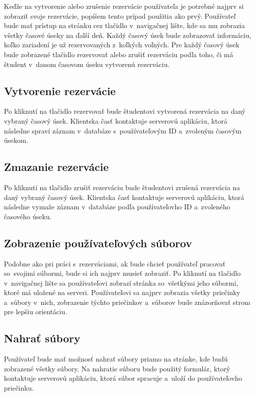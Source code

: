 Keďže na vytvorenie alebo zrušenie rezervácie používateľa je potrebné najprv si zobraziť svoje rezervácie, popíšem tento prípad použitia ako prvý. Používateľ bude mať prístup na stránku cez tlačidlo v~navigačnej lište, kde sa mu zobrazia všetky časové úseky na ďalší deň. Každý časový úsek bude zobrazovať informáciu, koľko zariadení je už rezervovaných z~koľkých voľných. Pre každý časový úsek bude zobrazené tlačidlo rezervovať alebo zrušiť rezerváciu podľa toho, či má študent v~danom časovom úseku vytvorenú rezerváciu. 

\subsection{Vytvorenie rezervácie}

Po kliknutí na tlačidlo rezervovať bude študentovi vytvorená rezervácia na daný vybraný časový úsek. Klientska časť kontaktuje serverovú aplikáciu, ktorá následne spraví záznam v~databáze s~používateľovým ID a~zvoleným časovým úsekom.


\subsection{Zmazanie rezervácie}

Po kliknutí na tlačidlo zrušiť rezerváciu bude študentovi zrušená rezervácia na daný vybraný časový úsek. Klientska časť kontaktuje serverovú aplikáciu, ktorá následne vymaže záznam v~databáze podľa používateľovho ID a~zvoleného časového úseku.

\subsection{Zobrazenie používateľových súborov}

Podobne ako pri práci s~rezerváciami, ak bude chcieť používateľ pracovať so~svojimi súbormi, bude si ich najprv musieť zobraziť. Po kliknutí na tlačidlo v~navigačnej lište sa používateľovi zobrazí stránka so~všetkými jeho súbormi, ktoré má uložené na serveri. Používateľovi sa najprv zobrazia všetky priečinky a~súbory v~nich, zobrazenie týchto priečinkov a~súborov bude znázorňovať strom pre lepšiu orientáciu.

\subsection{Nahrať súbory}

Používateľ bude mať možnosť nahrať súbory priamo na stránke, kde budú zobrazené všetky súbory. Na nahratie súboru bude použitý formulár, ktorý kontaktuje serverovú aplikáciu, ktorá súbor spracuje a~uloží do používateľovho priečinku.

